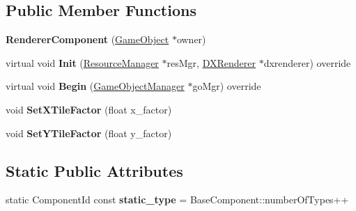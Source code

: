 \subsection*{Public Member Functions}
\begin{DoxyCompactItemize}
\item 
\mbox{\label{classRendererComponent_ae7145f3c02a50108603e0a2ac93f4fdc}} 
{\bfseries Renderer\+Component} (\hyperlink{classGameObject}{Game\+Object} $\ast$owner)
\item 
\mbox{\label{classRendererComponent_aa6ae449d8ab701dc0eb20d1a8879765f}} 
virtual void {\bfseries Init} (\hyperlink{classResourceManager}{Resource\+Manager} $\ast$res\+Mgr, \hyperlink{classDXRenderer}{D\+X\+Renderer} $\ast$dxrenderer) override
\item 
\mbox{\label{classRendererComponent_a169372f7e5068ad4095923c694372d7f}} 
virtual void {\bfseries Begin} (\hyperlink{classGameObjectManager}{Game\+Object\+Manager} $\ast$go\+Mgr) override
\item 
\mbox{\label{classRendererComponent_ac048cad5c196178d33226f65ba48c846}} 
void {\bfseries Set\+X\+Tile\+Factor} (float x\+\_\+factor)
\item 
\mbox{\label{classRendererComponent_ab0480d2d8405095b06329a55258a9982}} 
void {\bfseries Set\+Y\+Tile\+Factor} (float y\+\_\+factor)
\end{DoxyCompactItemize}
\subsection*{Static Public Attributes}
\begin{DoxyCompactItemize}
\item 
\mbox{\label{classRendererComponent_a03684f768caa23cc09be9998da14d0a4}} 
static Component\+Id const {\bfseries static\+\_\+type} = Base\+Component\+::number\+Of\+Types++
\end{DoxyCompactItemize}
